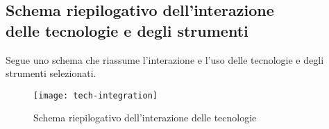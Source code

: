 \documentclass[../NormediProgetto.tex]{subfiles}
\begin{document}
	
	\subsection{Schema riepilogativo dell'interazione \\ delle tecnologie e degli strumenti}
	
	Segue uno schema che riassume l'interazione e l'uso delle tecnologie e degli strumenti selezionati.
	
	\begin{figure}
		\texttt{[image: tech-integration]}
		\centering
		\caption{Schema riepilogativo dell'interazione delle tecnologie}
	\end{figure}
\end{document}
